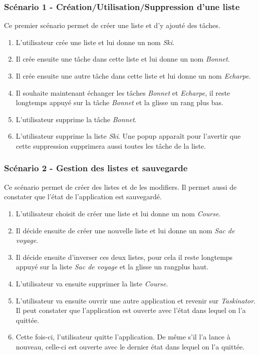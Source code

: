 \documentclass[a4paper,10pt]{article}
\begin{document}
\subsubsection{Scénario 1 - Création/Utilisation/Suppression d'une liste}
Ce premier scénario permet de créer une liste et d'y ajouté des tâches.
\begin{enumerate}
\item{L'utilisateur crée une liste et lui donne un nom \textit{Ski}.}
\item{Il crée ensuite une tâche dans cette liste et lui donne un nom \textit{Bonnet}.}
\item{Il crée ensuite une autre tâche dans cette liste et lui donne un nom \textit{Echarpe}.}
\item{Il souhaite maintenant échanger les tâches \textit{Bonnet} et \textit{Echarpe}, il reste longtemps appuyé sur la tâche \textit{Bonnet} et la glisse un rang plus bas.} %
\item{L'utilisateur supprime la tâche \textit{Bonnet}.}
\item{L'utilisateur supprime la liste \textit{Ski}. Une popup apparaît pour l'avertir que cette suppression supprimera aussi toutes les tâche de la liste.}
\end{enumerate}

\subsubsection{Scénario 2 - Gestion des listes et sauvegarde}
Ce scénario permet de créer des listes et de les modifiers. Il permet aussi de constater que l'état de l'application est sauvegardé.
\begin{enumerate}
\item{L'utilisateur choisit de créer une liste et lui donne un nom \textit{Course}.}
\item{Il décide ensuite de créer une nouvelle liste et lui donne un nom \textit{Sac de voyage}.}
\item{Il décide ensuite d'inverser ces deux listes, pour cela il reste longtemps appuyé sur la liste \textit{Sac de voyage} et la glisse un rangplus haut.}
\item{L'utilisateur va ensuite supprimer la liste \textit{Course}.}
\item{L'utilisateur va ensuite ouvrir une autre application et revenir sur \textit{Taskinator}. Il peut constater que l'application est ouverte avec l'état dans lequel on l'a quittée.}
\item{Cette fois-ci, l'utilisateur quitte l'application. De même s'il l'a lance à nouveau, celle-ci est ouverte avec le dernier état dans lequel on l'a quittée.}
\end{enumerate}
\end{document}
